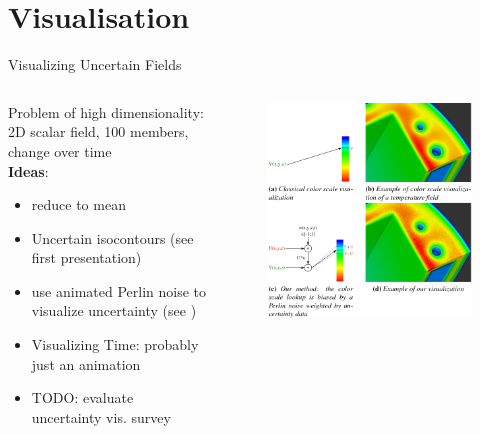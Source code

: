 \section{Visualisation}
\begin{frame}{Visualizing Uncertain Fields}
\begin{columns}
      \begin{column}{.6 \textwidth}
Problem of high dimensionality: 2D scalar field, 100 members, change over time \\ 
\textbf{Ideas}:
         \begin{itemize}
           \item reduce to mean 
           \item Uncertain isocontours (see first presentation)
           \item use animated Perlin noise to visualize uncertainty (see \citeauthor{coninx_visualization_2011} \cite{coninx_visualization_2011})
           \item Visualizing Time: probably just an animation
           \item TODO: evaluate uncertainty vis. survey \cite{kamal_recent_2021}
         \end{itemize}
        
      \end{column}
      \begin{column}{.4 \textwidth}
    \begin{figure}[t]
      \centering
      \includegraphics[width=.8 \columnwidth]{imglib/perlin_noise.png}
    \end{figure}
        
      \end{column}
    \end{columns}

\end{frame}
